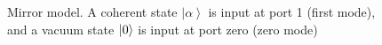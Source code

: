 \begin{figure}
\centering



\caption{Mirror model. A coherent state $\left|\alpha\right>$ is input at port 1 (first mode), and a vacuum state $\ket{0}$ is input at port zero (zero mode)}
\label{figPart2Interfero_3}
\end{figure}